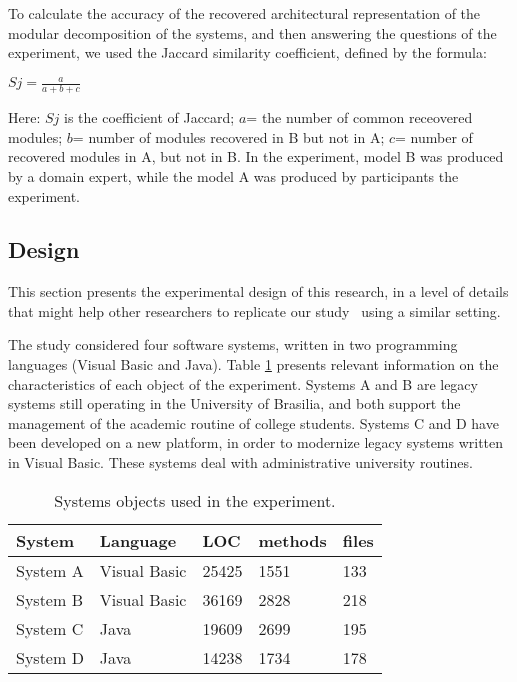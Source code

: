 To calculate the accuracy of the recovered architectural representation of the modular decomposition 
of the systems, and then answering the questions of the experiment, we used the 
Jaccard similarity coefficient, defined by the formula:

\begin{center}
	$Sj= \frac{a}{a+b+c}$
\end{center}

Here: $Sj$ is the coefficient of Jaccard; $a$= the number of common receovered 
modules; $b$= number of modules recovered in B but not in A; $c$= number of recovered 
modules in A, but not in B. In the experiment, model B was produced by a domain expert, while the model 
A was produced by participants  the experiment.

\subsection{Design}%

This section presents the experimental design of 
this research, in a level of details that might help other researchers to replicate 
our study~\cite{Juristo_2010} using a similar setting.


The study considered four software systems, written in 
two programming languages (Visual Basic and Java).
Table \ref{tabelaSistemasObjetos}  presents relevant information on 
the characteristics of each object of the experiment. Systems A 
and B are legacy systems still operating in the University of Brasilia, 
and both support the management of the academic routine of college students. 
Systems C and D have been developed on a new platform, in order 
to modernize legacy systems written in Visual Basic. These systems 
deal with administrative university routines.

\begin{table}[h]
	\centering
	\caption{Systems objects used in the experiment.}
	\label{tabelaSistemasObjetos}
	\begin{tabular}{|lllll|}
		\hline
		System  & Language    & LOC   &  methods & files  \\ \hline
		System A             & Visual Basic & 25425 & 1551       & 133        \\
		System B           & Visual Basic & 36169 & 2828       & 218        \\
		System C            & Java         & 19609 & 2699       & 195        \\
		System D           & Java         & 14238 & 1734       & 178        \\ \hline
	\end{tabular}
\end{table}

